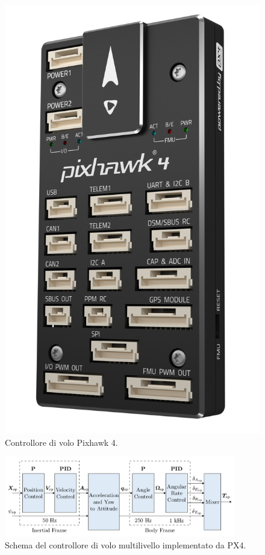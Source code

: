 \begin{figure}
    \centering
    \includegraphics[scale=0.1]{figs/chapter3/pixhawk4.jpg}
    \caption{Controllore di volo Pixhawk 4.}
    \label{fig:pixhawk}
\end{figure}

\begin{figure}
    \centering
    \includegraphics[width=0.9\textwidth]{figs/chapter3/px4-controller.jpg}
    \caption{Schema del controllore di volo multilivello implementato da PX4.}
    \label{fig:px4controller}
\end{figure}

